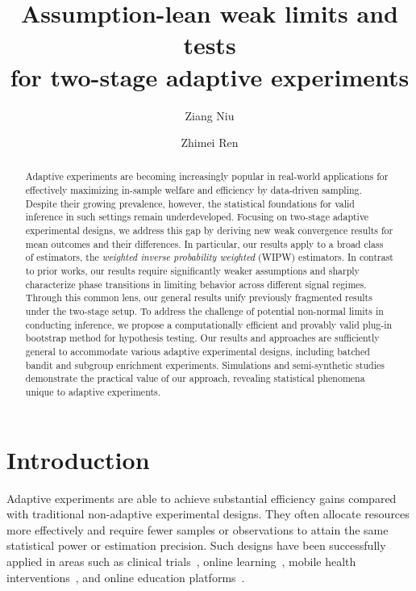 \documentclass[12pt]{article}
\title{Assumption-lean weak limits and tests \\
for two-stage adaptive experiments}
\begin{document}
\author{Ziang Niu}
\author{Zhimei Ren}
\maketitle

\begin{abstract}
	Adaptive experiments are becoming increasingly popular in real-world applications for effectively maximizing in-sample welfare and efficiency by data-driven sampling. Despite their growing prevalence, however, the statistical foundations for valid inference in such settings remain underdeveloped. Focusing on two-stage adaptive experimental designs, we address this gap by deriving new weak convergence results for mean outcomes and their differences. In particular, our results apply to a broad class of estimators, the \textit{weighted inverse probability weighted} (WIPW) estimators. In contrast to prior works, our results require significantly weaker assumptions and sharply characterize phase transitions in limiting behavior across different signal regimes. Through this common lens, our general results unify previously fragmented results under the two-stage setup. 
	To address the challenge of potential non-normal limits in conducting inference, we propose a computationally efficient and provably valid plug-in bootstrap method for hypothesis testing. Our results and approaches are sufficiently general to accommodate various adaptive experimental designs, including batched bandit and subgroup enrichment experiments. Simulations and semi-synthetic studies demonstrate the practical value of our approach, revealing statistical phenomena unique to adaptive experiments.
\end{abstract}


\section{Introduction}


Adaptive experiments are able to achieve substantial efficiency gains compared with traditional non-adaptive experimental designs. They often allocate resources more effectively and require fewer samples or observations to attain the same statistical power or estimation precision. Such designs have been successfully applied in areas such as clinical trials~\citep{sampson2005drop,hu2006theory,magnusson2013group}, online learning~\citep{slivkins2019introduction,lattimore2020bandit}, mobile health interventions~\citep{klasnja2019efficacy,liao2020personalized}, and online education platforms~\citep{rafferty2019statistical,kizilcec2020scaling}.
\end{document}
